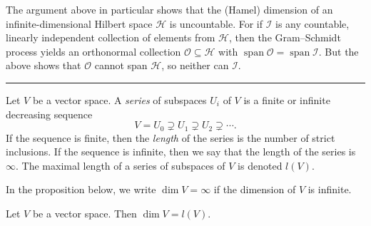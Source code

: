 \documentclass[article, a4paper, 11pt, oneside]{memoir}
\numberwithin{equation}{chapter}
\newcommand{\calO}{\mathcal{O}}
\newcommand{\calH}{\mathcal{H}}
\newcommand{\calI}{\mathcal{I}}
\DeclareMathOperator{\Span}{span}
\newcommand\fleuronbreak{\fancybreak{\textcolor{linkcolor}{\adfhangingflatleafleft}}}
\begin{document}
The argument above in particular shows that the (Hamel) dimension of an infinite-dimensional Hilbert space $\calH$ is uncountable. For if $\calI$ is any countable, linearly independent collection of elements from $\calH$, then the Gram--Schmidt process yields an orthonormal collection $\calO \subseteq \calH$ with $\Span \calO = \Span \calI$. But the above shows that $\calO$ cannot span $\calH$, so neither can $\calI$.

\fleuronbreak

Let $V$ be a vector space. A \emph{series} of subspaces $U_i$ of $V$ is a finite or infinite decreasing sequence
%
\begin{equation*}
    V
        = U_0
        \supsetneq U_1
        \supsetneq U_2
        \supsetneq \cdots.
\end{equation*}
%
If the sequence is finite, then the \emph{length} of the series is the number of strict inclusions. If the sequence is infinite, then we say that the length of the series is $\infty$. The maximal length of a series of subspaces of $V$ is denoted $l(V)$.

In the proposition below, we write $\dim V = \infty$ if the dimension of $V$ is infinite.

\begin{proposition}
    Let $V$ be a vector space. Then $\dim V = l(V)$.
\end{proposition}
\end{document}
